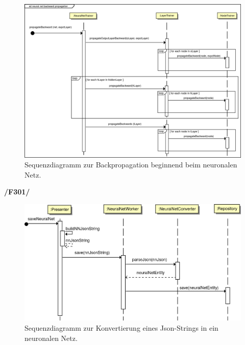 \begin{figure}[H]
\begin{center}
\includegraphics[width=15cm]{Abbildungen/UML/jan/gradientdescent1.png}
\caption{Sequenzdiagramm zur Backpropagation beginnend beim neuronalen Netz.}
\label{fig_sdBackpropagation}
\end{center}
\end{figure}

\textbf{/F301/} 
\begin{figure}[H]
\begin{center}
\includegraphics[width=15cm]{Abbildungen/UML/jan/convertJsonNNSD.png}
\caption{Sequenzdiagramm zur Konvertierung eines Json-Strings in ein neuronalen Netz.}
\label{fig_sdBackpropagation}
\end{center}
\end{figure}

